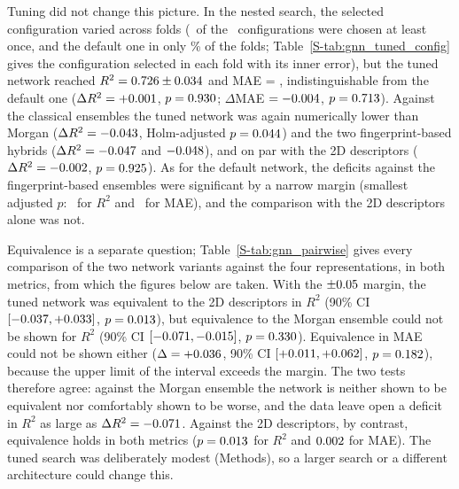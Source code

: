 Tuning did not change this picture. In the nested search, the selected configuration varied across folds (\GnnTunedNChosen\ of the \GnnTunedNConfigs\ configurations were chosen at least once, and the default one in only \GnnTunedDefaultChosenPct\% of the folds; Table~\ref{S-tab:gnn_tuned_config} gives the configuration selected in each fold with its inner error), but the tuned network reached $R^2 = 0.726 \pm 0.034$ and MAE = \GnnTunedMae, indistinguishable from the default one ($\Delta R^2 = +0.001$, $p = 0.930$; $\Delta$MAE $= -0.004$, $p = 0.713$). Against the classical ensembles the tuned network was again numerically lower than Morgan ($\Delta R^2 = -0.043$, Holm-adjusted $p = 0.044$) and the two fingerprint-based hybrids ($\Delta R^2 = -0.047$ and $-0.048$), and on par with the 2D descriptors ($\Delta R^2 = -0.002$, $p = 0.925$). As for the default network, the deficits against the fingerprint-based ensembles were significant by a narrow margin (smallest adjusted $p$: \GnnTunedVsMinPRTwo\ for $R^2$ and \GnnTunedVsMinPMae\ for MAE), and the comparison with the 2D descriptors alone was not.

Equivalence is a separate question; Table~\ref{S-tab:gnn_pairwise} gives every comparison of the two network variants against the four representations, in both metrics, from which the figures below are taken. With the $\pm0.05$ margin, the tuned network was equivalent to the 2D descriptors in $R^2$ (90\% CI $[-0.037, +0.033]$, $p = 0.013$), but equivalence to the Morgan ensemble could not be shown for $R^2$ (90\% CI $[-0.071, -0.015]$, $p = 0.330$). Equivalence in MAE could not be shown either ($\Delta = +0.036$, 90\% CI $[+0.011, +0.062]$, $p = 0.182$), because the upper limit of the interval exceeds the margin. The two tests therefore agree: against the Morgan ensemble the network is neither shown to be equivalent nor comfortably shown to be worse, and the data leave open a deficit in $R^2$ as large as $\Delta R^2 = -0.071$. Against the 2D descriptors, by contrast, equivalence holds in both metrics ($p = 0.013$ for $R^2$ and $0.002$ for MAE). The tuned search was deliberately modest (Methods), so a larger search or a different architecture could change this.

